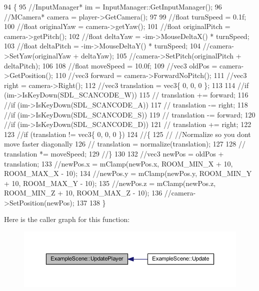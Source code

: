 \begin{DoxyCode}
94 \{
95     \textcolor{comment}{//InputManager* im = InputManager::GetInputManager();}
96     \textcolor{comment}{//MCamera* camera = player->GetCamera();}
97 
99     \textcolor{comment}{//float turnSpeed = 0.1f;}
100     \textcolor{comment}{//float originalYaw = camera->getYaw();}
101     \textcolor{comment}{//float originalPitch = camera->getPitch();}
102     \textcolor{comment}{//float deltaYaw = -im->MouseDeltaX() * turnSpeed;}
103     \textcolor{comment}{//float deltaPitch = -im->MouseDeltaY() * turnSpeed;}
104     \textcolor{comment}{//camera->SetYaw(originalYaw + deltaYaw);}
105     \textcolor{comment}{//camera->SetPitch(originalPitch + deltaPitch);}
106 
108     \textcolor{comment}{//float moveSpeed = 10.0f;}
109     \textcolor{comment}{//vec3 oldPos = camera->GetPosition();}
110     \textcolor{comment}{//vec3 forward = camera->ForwardNoPitch();}
111     \textcolor{comment}{//vec3 right = camera->Right();}
112     \textcolor{comment}{//vec3 translation = vec3\{ 0, 0, 0 \};}
113 
114     \textcolor{comment}{//if (im->IsKeyDown(SDL\_SCANCODE\_W))}
115     \textcolor{comment}{//  translation += forward;}
116     \textcolor{comment}{//if (im->IsKeyDown(SDL\_SCANCODE\_A))}
117     \textcolor{comment}{//  translation -= right;}
118     \textcolor{comment}{//if (im->IsKeyDown(SDL\_SCANCODE\_S))}
119     \textcolor{comment}{//  translation -= forward;}
120     \textcolor{comment}{//if (im->IsKeyDown(SDL\_SCANCODE\_D))}
121     \textcolor{comment}{//  translation += right;}
122 
123     \textcolor{comment}{//if (translation != vec3\{ 0, 0, 0 \})}
124     \textcolor{comment}{//\{}
125     \textcolor{comment}{//  //Normalize so you dont move faster diagonally}
126     \textcolor{comment}{//  translation = normalize(translation);}
127 
128     \textcolor{comment}{//  translation *= moveSpeed;}
129     \textcolor{comment}{//\}}
130 
132     \textcolor{comment}{//vec3 newPos = oldPos + translation;}
133     \textcolor{comment}{//newPos.x = mClamp(newPos.x, ROOM\_MIN\_X + 10, ROOM\_MAX\_X - 10);}
134     \textcolor{comment}{//newPos.y = mClamp(newPos.y, ROOM\_MIN\_Y + 10, ROOM\_MAX\_Y - 10);}
135     \textcolor{comment}{//newPos.z = mClamp(newPos.z, ROOM\_MIN\_Z + 10, ROOM\_MAX\_Z - 10);}
136     \textcolor{comment}{//camera->SetPosition(newPos);}
137 
138 \}
\end{DoxyCode}


Here is the caller graph for this function\+:\nopagebreak
\begin{figure}[H]
\begin{center}
\leavevmode
\includegraphics[width=350pt]{class_example_scene_a8bdc4c3e8e005ac5e972e052d5413645_icgraph}
\end{center}
\end{figure}





